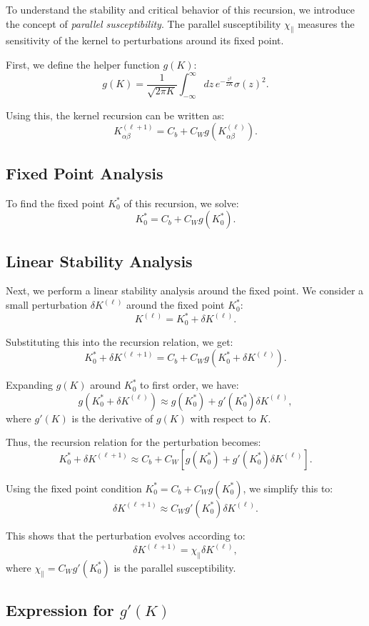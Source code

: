 \documentclass{article}
\begin{document}
To understand the stability and critical behavior of this recursion, we introduce the concept of \textit{parallel susceptibility}. The parallel susceptibility $\chi_{\parallel}$ measures the sensitivity of the kernel to perturbations around its fixed point.

First, we define the helper function $g(K)$:
\[
g(K) = \frac{1}{\sqrt{2\pi K}} \int_{-\infty}^{\infty} dz \, e^{-\frac{z^2}{2K}} \sigma(z)^2.
\]

Using this, the kernel recursion can be written as:
\[
K_{\alpha \beta}^{(\ell + 1)} = C_b + C_W g(K_{\alpha \beta}^{(\ell)}).
\]

\subsection*{Fixed Point Analysis}

To find the fixed point $K_0^*$ of this recursion, we solve:
\[
K_0^* = C_b + C_W g(K_0^*).
\]

\subsection*{Linear Stability Analysis}

Next, we perform a linear stability analysis around the fixed point. We consider a small perturbation $\delta K^{(\ell)}$ around the fixed point $K_0^*$:
\[
K^{(\ell)} = K_0^* + \delta K^{(\ell)}.
\]

Substituting this into the recursion relation, we get:
\[
K_0^* + \delta K^{(\ell + 1)} = C_b + C_W g(K_0^* + \delta K^{(\ell)}).
\]

Expanding $g(K)$ around $K_0^*$ to first order, we have:
\[
g(K_0^* + \delta K^{(\ell)}) \approx g(K_0^*) + g'(K_0^*) \delta K^{(\ell)},
\]
where $g'(K)$ is the derivative of $g(K)$ with respect to $K$.

Thus, the recursion relation for the perturbation becomes:
\[
K_0^* + \delta K^{(\ell + 1)} \approx C_b + C_W \left[ g(K_0^*) + g'(K_0^*) \delta K^{(\ell)} \right].
\]

Using the fixed point condition $K_0^* = C_b + C_W g(K_0^*)$, we simplify this to:
\[
\delta K^{(\ell + 1)} \approx C_W g'(K_0^*) \delta K^{(\ell)}.
\]

This shows that the perturbation evolves according to:
\[
\delta K^{(\ell + 1)} = \chi_{\parallel} \delta K^{(\ell)},
\]
where $\chi_{\parallel} = C_W g'(K_0^*)$ is the parallel susceptibility.

\subsection*{Expression for $g'(K)$}
\end{document}
